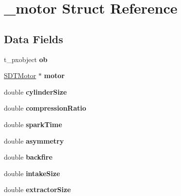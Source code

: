 \hypertarget{struct__motor}{}\section{\+\_\+motor Struct Reference}
\label{struct__motor}
\subsection*{Data Fields}
\begin{DoxyCompactItemize}
\item 
\hypertarget{struct__motor_a55b4380edb216f04a1c42b9095594963}{}t\+\_\+pxobject {\bfseries ob}\label{struct__motor_a55b4380edb216f04a1c42b9095594963}

\item 
\hypertarget{struct__motor_a80b6b5f552e202a8cf9c26210fb20f92}{}\hyperlink{struct_s_d_t_motor}{S\+D\+T\+Motor} $\ast$ {\bfseries motor}\label{struct__motor_a80b6b5f552e202a8cf9c26210fb20f92}

\item 
\hypertarget{struct__motor_ab1f60ca94cdcdb38d9f3d8461139c1e4}{}double {\bfseries cylinder\+Size}\label{struct__motor_ab1f60ca94cdcdb38d9f3d8461139c1e4}

\item 
\hypertarget{struct__motor_a75b5b2159062ed08cec96031dcf5ab04}{}double {\bfseries compression\+Ratio}\label{struct__motor_a75b5b2159062ed08cec96031dcf5ab04}

\item 
\hypertarget{struct__motor_aa2d3d53fc6314322af712ae1f4b47e25}{}double {\bfseries spark\+Time}\label{struct__motor_aa2d3d53fc6314322af712ae1f4b47e25}

\item 
\hypertarget{struct__motor_a9922abaa2e5ed1caebbbcd07905cf721}{}double {\bfseries asymmetry}\label{struct__motor_a9922abaa2e5ed1caebbbcd07905cf721}

\item 
\hypertarget{struct__motor_a8911102d23d5ca9efbb665ee1e0589e7}{}double {\bfseries backfire}\label{struct__motor_a8911102d23d5ca9efbb665ee1e0589e7}

\item 
\hypertarget{struct__motor_a603f3594b476bcdf20b2eb4176094616}{}double {\bfseries intake\+Size}\label{struct__motor_a603f3594b476bcdf20b2eb4176094616}

\item 
\hypertarget{struct__motor_a1e3b5a5e903dd307e56ddaf8b866cf97}{}double {\bfseries extractor\+Size}\label{struct__motor_a1e3b5a5e903dd307e56ddaf8b866cf97}


\end{DoxyCompactItemize}
